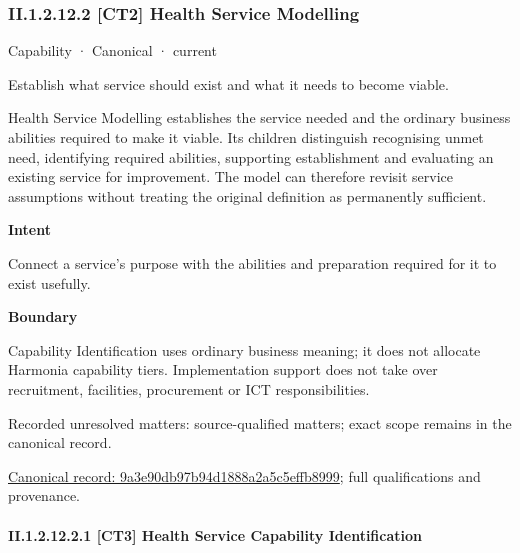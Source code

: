 \subsubsection*{II.1.2.12.2 [CT2] Health Service Modelling}
\label{navigation:II.1.2.12.2}

\label{element:9a3e90db97b94d1888a2a5c5effb8999}
{\small Capability · Canonical · current}\par

Establish what service should exist and what it needs to become viable.



Health Service Modelling establishes the service needed and the ordinary business abilities required to make it viable. Its children distinguish recognising unmet need, identifying required abilities, supporting establishment and evaluating an existing service for improvement. The model can therefore revisit service assumptions without treating the original definition as permanently sufficient.



\textbf{Intent}



Connect a service's purpose with the abilities and preparation required for it to exist usefully.



\textbf{Boundary}



Capability Identification uses ordinary business meaning; it does not allocate Harmonia capability tiers. Implementation support does not take over recruitment, facilities, procurement or ICT responsibilities.


{\small Recorded unresolved matters: source-qualified matters; exact scope remains in the canonical record.}\par
{\footnotesize \href{../../../../../../../continuum/strategy/capability/9a3e90db97b94d1888a2a5c5effb8999.md}{Canonical record: 9a3e90db97b94d1888a2a5c5effb8999}; full qualifications and provenance.}\par
\paragraph*{II.1.2.12.2.1 [CT3] Health Service Capability Identification}
\label{navigation:II.1.2.12.2.1}

